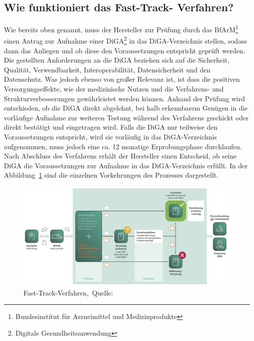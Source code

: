 \subsection{Wie funktioniert das Fast-Track- Verfahren?}
Wie bereits oben genannt, muss der Hersteller zur Prüfung durch das BfArM\footnote{Bundesinstitut für Arzneimittel und Medizinprodukte} einen Antrag zur Aufnahme einer DiGA\footnote{Digitale Gesundheitsanwendung} in das DiGA-Verzeichnis stellen, sodass dann das Anliegen und ob diese den Voraussetzungen entspricht geprüft werden. Die gestellten Anforderungen an die DiGA beziehen sich auf die Sicherheit, Qualität, Verwendbarkeit, Interoperabilität, Datensicherheit und den Datenschutz.
Was jedoch ebenso von großer Relevanz ist, ist dass die positiven Versorgungseffekte, wie der medizinische Nutzen und die Verfahrens- und Strukturverbesserungen gewährleistet werden können.
Anhand der Prüfung wird entschieden, ob die DiGA direkt abgelehnt, bei halb erkennbarem Genügen in die vorläufige Aufnahme zur weiteren Testung während des Verfahrens geschickt oder direkt bestätigt und eingetragen wird.
Falls die DiGA nur teilweise den Voraussetzungen entspricht, wird sie vorläufig in das DiGA-Verzeichnis aufgenommen, muss jedoch eine ca. 12 monatige Erprobungsphase durchlaufen. Nach Abschluss des Verfahrens erhält der Hersteller einen Entscheid, ob seine DiGA die Voraussetzungen zur Aufnahme in das DiGA-Verzeichnis erfüllt. 
In der Abbildung~\ref{fig:fasttrackverfahren} sind die einzelnen Vorkehrungen des Prozesses dargestellt.~\cite{digahersteller}

\begin{figure}[H]
	\centering
	\includegraphics[width=450px, keepaspectratio]{assets/fastTrack_prozess.png}
	\caption[Fast-Track-Verfahren]{Fast-Track-Verfahren,~Quelle:~\cite{digahersteller}}
	\label{fig:fasttrackverfahren}
\end{figure}

